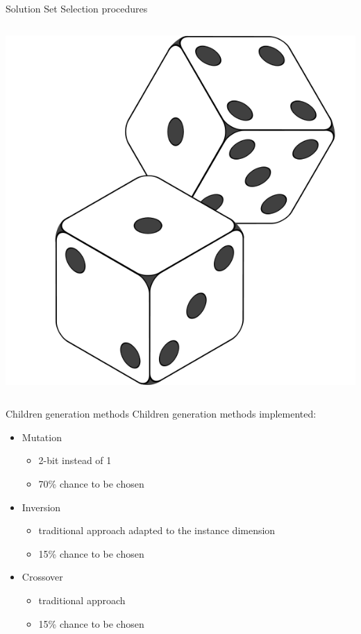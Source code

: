 \documentclass[12pt]{beamer}
\begin{document}
\begin{frame}[fragile]{Solution Set Selection procedures}
\begin{columns}
\begin{column}{0.5\textwidth}
{            \includegraphics[scale=0.15]{res/Random}
          }
      \end{column}
    \end{columns}
  \end{frame}

  \begin{frame}[fragile]{Children generation methods}
    Children generation methods implemented:
    \begin{itemize}
      \item Mutation
      \begin{itemize}
        \item 2-bit instead of 1
        \item 70\% chance to be chosen
      \end{itemize}
      \item Inversion
      \begin{itemize}
        \item traditional approach adapted to the instance dimension
        \item 15\% chance to be chosen
      \end{itemize}
      \item Crossover
       \begin{itemize}
        \item traditional approach
        \item 15\% chance to be chosen
      \end{itemize}
    \end{itemize}
  \end{frame}
\end{document}
